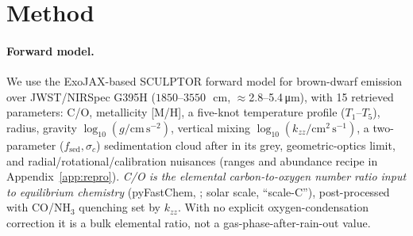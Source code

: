 \documentclass{article}
\begin{document}
\section{Method}
\label{sec:method}

\paragraph{Forward model.}
We use the ExoJAX-based \citep{kawahara2022,kawahara2025} SCULPTOR forward model for
brown-dwarf emission over JWST/NIRSpec G395H ($1850$--$3550$\,\si{\per\cm},
$\approx$2.8--5.4\,\si{\micro\meter}), with 15 retrieved parameters: C/O,
metallicity [M/H], a five-knot temperature profile ($T_1$--$T_5$), radius, gravity
$\log_{10}(g/\mathrm{cm\,s^{-2}})$, vertical mixing
$\log_{10}(k_{zz}/\mathrm{cm^{2}\,s^{-1}})$, a two-parameter
($f_{\mathrm{sed}},\sigma_c$) sedimentation cloud after \citet{ackerman2001} in
its grey, geometric-optics limit, and radial/rotational/calibration nuisances
(ranges and abundance recipe in Appendix~\ref{app:repro}). \emph{C/O is the
elemental carbon-to-oxygen number ratio input to equilibrium chemistry}
(pyFastChem, \citealt{stock2018,stock2022}; \citealt{asplund2009} solar scale,
``scale-C''), post-processed with CO/NH$_3$ quenching set by $k_{zz}$. With no
explicit oxygen-condensation correction it is a bulk elemental ratio, not a
gas-phase-after-rain-out value.
\end{document}
